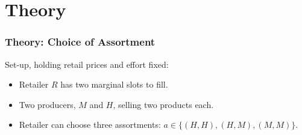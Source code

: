 \section{Theory}

\begin{frame}[label=intuition]
\frametitle{Theory: Choice of Assortment}
Set-up, holding retail prices and effort fixed:
\begin{itemize}
\item Retailer $R$ has two marginal slots to fill.
\item Two producers, $M$ and $H$, selling two products each.
\item Retailer can choose three assortments: $a \in \{ (H,H), (H,M), (M,M)\}$.
\end{itemize}
\end{frame}



